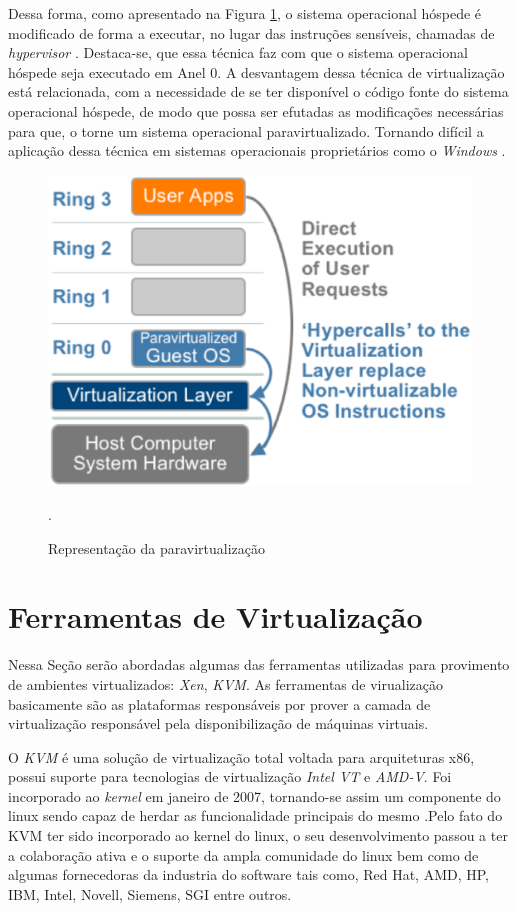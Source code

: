 Dessa forma, como apresentado na Figura \ref{paravirtualization}, o sistema operacional hóspede é modificado de forma a executar, no lugar das instruções sensíveis, chamadas de \textit{hypervisor} \cite{tanembaum}. Destaca-se, que essa técnica faz com que o sistema operacional hóspede seja executado em Anel 0. A desvantagem dessa técnica de virtualização está relacionada, com a necessidade de se ter disponível o código fonte do sistema operacional hóspede, de modo que possa ser efutadas as modificações necessárias para que, o torne um sistema operacional paravirtualizado. Tornando difícil a aplicação dessa técnica em sistemas operacionais proprietários como o \textit{Windows} \cite{tanembaum}.
\begin{figure}[!htb]
\centering
\includegraphics [keepaspectratio=true,scale=0.3]{figuras/paravirtualization2.eps}
\caption{Representação da paravirtualização}
\cite{vmware}.
\label{paravirtualization}
\end{figure}

\section{Ferramentas de Virtualização}
Nessa Seção serão abordadas algumas das ferramentas utilizadas para provimento de ambientes virtualizados: \textit{Xen}, \textit{KVM}. As ferramentas de virualização basicamente são as plataformas responsáveis por prover a camada de virtualização responsável pela disponibilização de máquinas virtuais.

O \textit{KVM} é uma solução de virtualização total voltada para arquiteturas x86, possui suporte para tecnologias de virtualização \textit{Intel VT} e \textit{AMD-V}. Foi incorporado ao \textit{kernel} em janeiro de 2007, tornando-se assim um componente do linux sendo capaz de herdar as funcionalidade principais do mesmo \cite{redhatkvm,qumranet}.Pelo fato do KVM ter sido incorporado ao kernel do linux, o seu desenvolvimento passou a ter a colaboração ativa e o suporte da ampla comunidade do linux bem como de algumas fornecedoras da industria do software tais como, Red Hat, AMD, HP, IBM, Intel, Novell, Siemens, SGI entre outros\cite {redhatkvm}.

